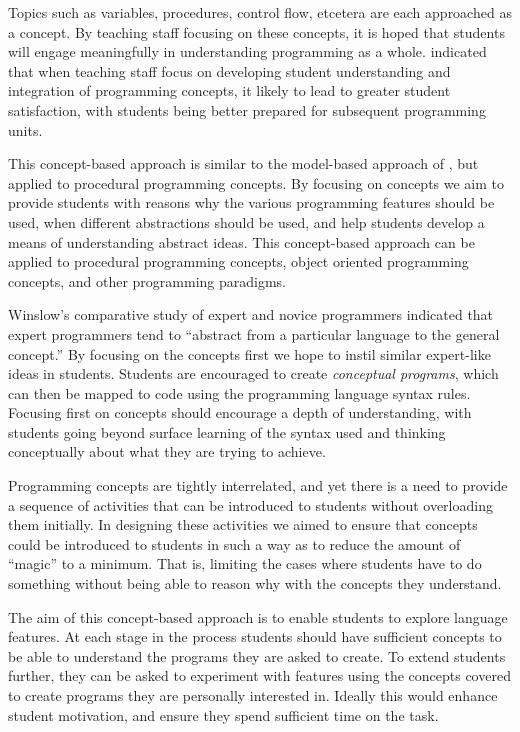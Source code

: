 Topics such as variables, procedures, control flow, etcetera are each approached as a concept. By teaching staff focusing on these concepts, it is hoped that students will engage meaningfully in understanding programming as a whole. \citet{Bruce:2003} indicated that when teaching staff focus on developing student understanding and integration of programming concepts, it likely to lead to greater student satisfaction, with students being better prepared for subsequent programming units.

This concept-based approach is similar to the model-based approach of \citet{Bennedsen:2004}, but applied to procedural programming concepts. By focusing on concepts we aim to provide students with reasons why the various programming features should be used, when different abstractions should be used, and help students develop a means of understanding abstract ideas. This concept-based approach can be applied to procedural programming concepts, object oriented programming concepts, and other programming paradigms. 

Winslow's comparative study of expert and novice programmers \cite{Winslow:1996} indicated that expert programmers tend to ``abstract from a particular language to the general concept.'' By focusing on the concepts first we hope to instil similar expert-like ideas in students. Students are encouraged to create \emph{conceptual programs}, which can then be mapped to code using the programming language syntax rules. Focusing first on concepts should encourage a depth of understanding, with students going beyond surface learning of the syntax used and thinking conceptually about what they are trying to achieve.

Programming concepts are tightly interrelated, and yet there is a need to provide a sequence of activities that can be introduced to students without overloading them initially. In designing these activities we aimed to ensure that concepts could be introduced to students in such a way as to reduce the amount of ``magic'' to a minimum. That is, limiting the cases where students have to do something without being able to reason why with the concepts they understand.

The aim of this concept-based approach is to enable students to explore language features. At each stage in the process students should have sufficient concepts to be able to understand the programs they are asked to create. To extend students further, they can be asked to experiment with features using the concepts covered to create programs they are personally interested in. Ideally this would enhance student motivation, and ensure they spend sufficient time on the task. 

